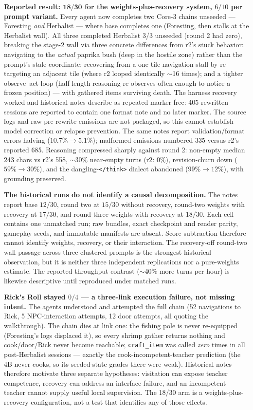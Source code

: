 \documentclass[11pt]{article}
\begin{document}
\textbf{Reported result: $\mathbf{18/30}$ for the weights-plus-recovery system, $6/10$ per prompt
variant.} Every agent now completes two Core-3 chains unseeded --- Foresting \emph{and}
Herbalist --- where base completes one (Foresting, then stalls at the Herbalist wall). All three
completed Herbalist 3/3 unseeded (round 2 had zero), breaking the stage-2 wall via three
concrete differences from r2's stuck behavior: navigating to the \emph{actual} paprika bush
(deep in the hostile zone) rather than the prompt's stale coordinate; recovering from a one-tile
navigation stall by re-targeting an adjacent tile (where r2 looped identically $\sim$16 times);
and a tighter observe--act loop (half-length reasoning re-observes often enough to notice a
frozen position) --- with gathered items surviving death. The harness recovery worked and
historical notes describe as repeated-marker-free: 405 rewritten sessions are reported to contain
one format note and no later marker. The source logs and raw pre-rewrite emissions are not
packaged, so this cannot establish model correction or relapse prevention. The same notes report
validation/format errors halving ($10.7\% \rightarrow 5.1\%$); malformed
emissions numbered 335 versus r2's reported 685. Reasoning
compressed sharply against round 2: non-empty median 243 chars vs r2's 558, $\sim$30\% near-empty
turns (r2: $0\%$), revision-churn down ($59\% \rightarrow 30\%$), and the
dangling-\texttt{</think>} dialect abandoned ($99\% \rightarrow 12\%$), with grounding preserved.

\textbf{The historical runs do not identify a causal decomposition.} The notes report base
$12/30$, round two at $15/30$ without recovery, round-two weights with recovery at $17/30$, and
round-three weights with recovery at $18/30$. Each cell contains one unmatched run; raw bundles,
exact checkpoint and render parity, gameplay seeds, and immutable manifests are absent. Score
subtraction therefore cannot identify weights, recovery, or their interaction. The recovery-off
round-two wall passage across three clustered prompts is the strongest historical observation,
but it is neither three independent replications nor a pure-weights estimate. The reported
throughput contrast ($\sim$40\% more turns per hour) is likewise descriptive until reproduced
under matched runs.

\textbf{Rick's Roll stayed $0/4$ --- a three-link execution failure, not missing intent.} The
agents understood and attempted the full chain (52 navigations to Rick, 5 NPC-interaction
attempts, 12 door attempts, all quoting the walkthrough). The chain dies at link one: the fishing
pole is never re-equipped (Foresting's logs displaced it), so every shrimp gather returns nothing
and cook/door/Rick never become reachable; \texttt{craft\_item} was called \emph{zero} times in
all post-Herbalist sessions --- exactly the cook-incompetent-teacher prediction (the 4B never
cooks, so its seeded-state grades there were weak). Historical notes therefore motivate three
separate hypotheses: visitation can expose teacher competence, recovery can address an interface
failure, and an incompetent teacher cannot supply useful local supervision. The 18/30 arm is a
weights-plus-recovery configuration, not a test that identifies any of those effects.
\end{document}
